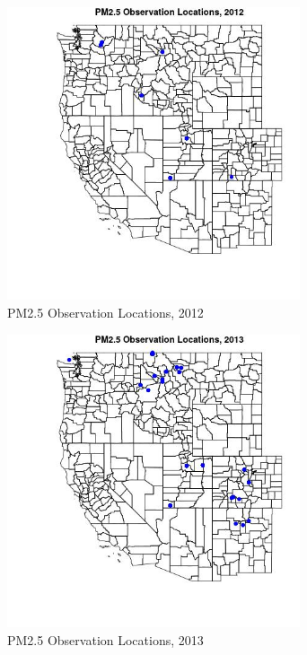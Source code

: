 \begin{figure} 
\centering  
\includegraphics[width=0.77\textwidth]{Code_Outputs/Report_PM25_Step4_part_e_de_duplicated_aves_ML_input_PlotLoc2012.jpg} 
\caption{\label{fig:Report_PM25_Step4_part_e_de_duplicated_aves_ML_inputPlotLoc2012}PM2.5 Observation Locations, 2012} 
\end{figure} 
 

\begin{figure} 
\centering  
\includegraphics[width=0.77\textwidth]{Code_Outputs/Report_PM25_Step4_part_e_de_duplicated_aves_ML_input_PlotLoc2013.jpg} 
\caption{\label{fig:Report_PM25_Step4_part_e_de_duplicated_aves_ML_inputPlotLoc2013}PM2.5 Observation Locations, 2013} 
\end{figure} 
 

